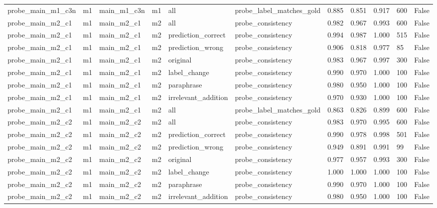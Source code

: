 \begin{tabular}{lllllllllll}
probe\_main\_m1\_c3n & m1 & main\_m1\_c3n & m1 & all & probe\_label\_matches\_gold & 0.885 & 0.851 & 0.917 & 600 & False \\
probe\_main\_m2\_c1 & m1 & main\_m2\_c1 & m2 & all & probe\_consistency & 0.982 & 0.967 & 0.993 & 600 & False \\
probe\_main\_m2\_c1 & m1 & main\_m2\_c1 & m2 & prediction\_correct & probe\_consistency & 0.994 & 0.987 & 1.000 & 515 & False \\
probe\_main\_m2\_c1 & m1 & main\_m2\_c1 & m2 & prediction\_wrong & probe\_consistency & 0.906 & 0.818 & 0.977 & 85 & False \\
probe\_main\_m2\_c1 & m1 & main\_m2\_c1 & m2 & original & probe\_consistency & 0.983 & 0.967 & 0.997 & 300 & False \\
probe\_main\_m2\_c1 & m1 & main\_m2\_c1 & m2 & label\_change & probe\_consistency & 0.990 & 0.970 & 1.000 & 100 & False \\
probe\_main\_m2\_c1 & m1 & main\_m2\_c1 & m2 & paraphrase & probe\_consistency & 0.980 & 0.950 & 1.000 & 100 & False \\
probe\_main\_m2\_c1 & m1 & main\_m2\_c1 & m2 & irrelevant\_addition & probe\_consistency & 0.970 & 0.930 & 1.000 & 100 & False \\
probe\_main\_m2\_c1 & m1 & main\_m2\_c1 & m2 & all & probe\_label\_matches\_gold & 0.863 & 0.826 & 0.899 & 600 & False \\
probe\_main\_m2\_c2 & m1 & main\_m2\_c2 & m2 & all & probe\_consistency & 0.983 & 0.970 & 0.995 & 600 & False \\
probe\_main\_m2\_c2 & m1 & main\_m2\_c2 & m2 & prediction\_correct & probe\_consistency & 0.990 & 0.978 & 0.998 & 501 & False \\
probe\_main\_m2\_c2 & m1 & main\_m2\_c2 & m2 & prediction\_wrong & probe\_consistency & 0.949 & 0.891 & 0.991 & 99 & False \\
probe\_main\_m2\_c2 & m1 & main\_m2\_c2 & m2 & original & probe\_consistency & 0.977 & 0.957 & 0.993 & 300 & False \\
probe\_main\_m2\_c2 & m1 & main\_m2\_c2 & m2 & label\_change & probe\_consistency & 1.000 & 1.000 & 1.000 & 100 & False \\
probe\_main\_m2\_c2 & m1 & main\_m2\_c2 & m2 & paraphrase & probe\_consistency & 0.990 & 0.970 & 1.000 & 100 & False \\
probe\_main\_m2\_c2 & m1 & main\_m2\_c2 & m2 & irrelevant\_addition & probe\_consistency & 0.980 & 0.950 & 1.000 & 100 & False \\

\end{tabular}
